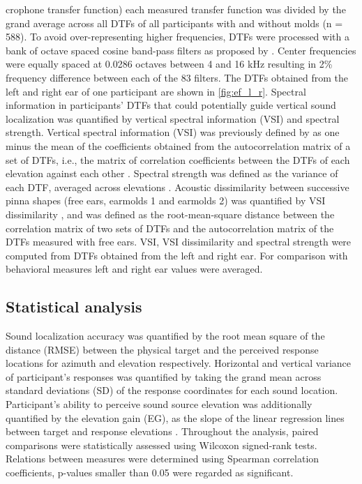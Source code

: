 crophone transfer function) each measured transfer function was divided by the grand average across all DTFs of all participants with and without molds (n = 588). To avoid over-representing higher frequencies, DTFs were processed with a bank of octave spaced cosine band-pass filters as proposed by \citet{middlebrooks_individual_1999}. Center frequencies were equally spaced at 0.0286 octaves between 4 and 16 kHz resulting in 2\% frequency difference between each of the 83 filters. The DTFs obtained from the left and right ear of one participant are shown in \cref{fig:ef_l_r}. Spectral information in participants' DTFs that could potentially guide vertical sound localization was quantified by vertical spectral information (VSI) and spectral strength. Vertical spectral information (VSI) was previously defined by \citet{trapeau_fast_2016} as one minus the mean of the coefficients obtained from the autocorrelation matrix of a set of DTFs, i.e., the matrix of correlation coefficients between the DTFs of each elevation against each other \citep{hofman_spectro-temporal_1998}. Spectral strength was defined as the variance of each DTF, averaged across elevations \citep{andeol_sound_2013}. Acoustic dissimilarity between successive pinna shapes (free ears, earmolds 1 and earmolds 2) was quantified by VSI dissimilarity \citet{trapeau_fast_2016}, and was defined as the root-mean-square distance between the correlation matrix of two sets of DTFs and the autocorrelation matrix of the DTFs measured with free ears. VSI, VSI dissimilarity and spectral strength were computed from DTFs obtained from the left and right ear. For comparison with behavioral measures left and right ear values were averaged.

\subsection{Statistical analysis}
Sound localization accuracy was quantified by the root mean square of the distance (RMSE) between the physical target and the perceived response locations for azimuth and elevation respectively. Horizontal and vertical variance of participant’s responses was quantified by taking the grand mean across standard deviations (SD) of the response coordinates for each sound location. Participant’s ability to perceive sound source elevation was additionally quantified by the elevation gain (EG), as the slope of the linear regression lines between target and response elevations \citep{hofman_relearning_1998}. Throughout the analysis, paired comparisons were statistically assessed using Wilcoxon signed-rank tests. Relations between measures were determined using Spearman correlation coefficients, p-values smaller than 0.05 were regarded as significant.
